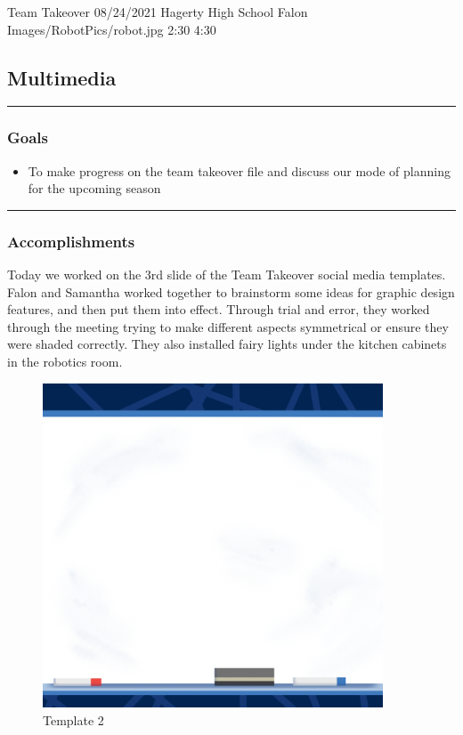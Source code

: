 \insertmeeting 
	{Team Takeover} 
	{08/24/2021}
	{Hagerty High School}
	{Falon}
	{Images/RobotPics/robot.jpg}
	{2:30}
 	{4:30}
	
\subsection*{Multimedia}
\noindent\hfil\rule{\textwidth}{.4pt}\hfil
\subsubsection*{Goals}
\begin{itemize}
    \item To make progress on the team takeover file and discuss our mode of planning for the upcoming season
  

\end{itemize} 

\noindent\hfil\rule{\textwidth}{.4pt}\hfil

\subsubsection*{Accomplishments}
Today we worked on the 3rd slide of the Team Takeover social media templates. Falon and Samantha worked together to brainstorm some ideas for graphic design features, and then put them into effect. Through trial and error, they worked through the meeting trying to make different aspects symmetrical or ensure they were shaded correctly. They also installed fairy lights under the kitchen cabinets in the robotics room.

\begin{figure}[htp]
\centering
\includegraphics[width=0.9\textwidth, angle=0]{Meetings/August/08-24-21/1.PNG}
\caption{Template 2}
\label{fig:pic1}
\end{figure}

